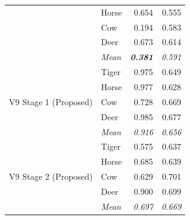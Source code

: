 \begin{table}[htbp]
\begin{tabular}{@{}llrr@{}}
    & Horse & 0.654 & 0.555 \\
    & Cow & 0.194 & 0.583 \\
    & Deer & 0.673 & 0.614 \\
    & \textit{Mean} & \textit{\textbf{0.381}} & \textit{0.591} \\
    \midrule
    \multirow{5}{*}{V9 Stage 1 (Proposed)} & Tiger & 0.975 & 0.649 \\
    & Horse & 0.977 & 0.628 \\
    & Cow & 0.728 & 0.669 \\
    & Deer & 0.985 & 0.677 \\
    & \textit{Mean} & \textit{0.916} & \textit{0.656} \\
    \midrule
    \multirow{5}{*}{V9 Stage 2 (Proposed)} & Tiger & 0.575 & 0.637 \\
    & Horse & 0.685 & 0.639 \\
    & Cow & 0.629 & 0.701 \\
    & Deer & 0.900 & 0.699 \\
    & \textit{Mean} & \textit{0.697} & \textit{0.669} \\
    \bottomrule
  \end{tabular}
\end{table}

